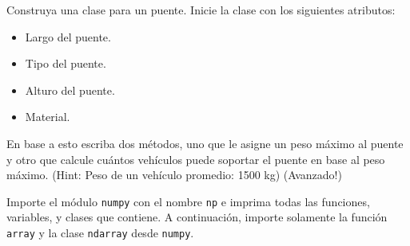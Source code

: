 \documentclass[11pt]{exam}
\begin{document}
\begin{questions}
\item Construya una clase para un puente. Inicie la clase con los siguientes atributos:
        \begin{itemize}
            \item Largo del puente.
            \item Tipo del puente.
            \item Alturo del puente.
            \item Material.
        \end{itemize}
     En base a esto escriba dos métodos, uno que le asigne un peso máximo al puente y otro
     que calcule cuántos vehículos puede soportar el puente en base al peso máximo. (Hint: Peso de un vehículo promedio: 1500 kg) (Avanzado!)

\item Importe el módulo \texttt{numpy} con el nombre \texttt{np} e imprima todas las funciones, variables, y clases que contiene. A continuación, importe solamente la función \texttt{array} y la clase \texttt{ndarray} desde \texttt{numpy}.

\end{questions}
\end{document}

